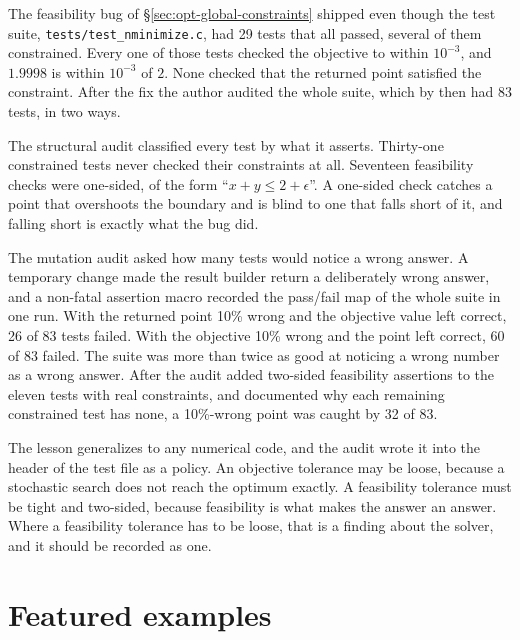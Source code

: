 The feasibility bug of \S\ref{sec:opt-global-constraints} shipped even though
the test suite, \texttt{tests/test\_nminimize.c}, had 29 tests that all passed,
several of them constrained. Every one of those tests checked the objective to
within \(10^{-3}\), and \(1.9998\) is within \(10^{-3}\) of \(2\). None checked
that the returned point satisfied the constraint. After the fix the author
audited the whole suite, which by then had 83 tests, in two ways.

The structural audit classified every test by what it asserts. Thirty-one
constrained tests never checked their constraints at all. Seventeen
feasibility checks were one-sided, of the form ``\(x + y \le 2 + \epsilon\)''.
A one-sided check catches a point that overshoots the boundary and is blind to
one that falls short of it, and falling short is exactly what the bug did.

The mutation audit asked how many tests would notice a wrong answer. A
temporary change made the result builder return a deliberately wrong answer,
and a non-fatal assertion macro recorded the pass/fail map of the whole suite
in one run. With the returned point 10\% wrong and the objective value left
correct, 26 of 83 tests failed. With the objective 10\% wrong and the point
left correct, 60 of 83 failed. The suite was more than twice as good at
noticing a wrong number as a wrong answer. After the audit added two-sided
feasibility assertions to the eleven tests with real constraints, and
documented why each remaining constrained test has none, a 10\%-wrong point was
caught by 32 of 83.

The lesson generalizes to any numerical code, and the audit wrote it into the
header of the test file as a policy. An objective tolerance may be loose,
because a stochastic search does not reach the optimum exactly. A feasibility
tolerance must be tight and two-sided, because feasibility is what makes the
answer an answer. Where a feasibility tolerance has to be loose, that is a
finding about the solver, and it should be recorded as one.


\section{Featured examples}
\label{sec:opt-featured}

